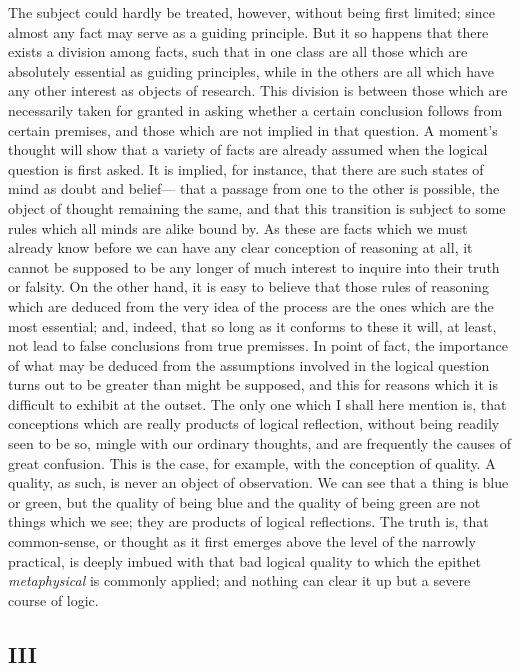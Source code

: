 The subject could hardly be treated, however, without being first limited; since almost any fact may serve as a guiding principle. But it so happens that there exists a division among facts, such that in one class are all those which are absolutely essential as guiding principles, while in the others are all which have any other interest as objects of research. This division is between those which are necessarily taken for granted in asking whether a certain conclusion follows from certain premises, and those which are not implied in that question. A moment's thought will show that a variety of facts are already assumed when the logical question is first asked. It is implied, for instance, that there are such states of mind as doubt and belief--- that a passage from one to the other is possible, the object of thought remaining the same, and that this transition is subject to some rules which all minds are alike bound by. As these are facts which we must already know before we can have any clear conception of reasoning at all, it cannot be supposed to be any longer of much interest to inquire into their truth or falsity. On the other hand, it is easy to believe that those rules of reasoning which are deduced from the very idea of the process are the ones which are the most essential; and, indeed, that so long as it conforms to these it will, at least, not lead to false conclusions from true premisses. In point of fact, the importance of what may be deduced from the assumptions involved in the logical question turns out to be greater than might be supposed, and this for reasons which it is difficult to exhibit at the outset. The only one which I shall here mention is, that conceptions which are really products of logical reflection, without being readily seen to be so, mingle with our ordinary thoughts, and are frequently the causes of great confusion. This is the case, for example, with the conception of quality. A quality, as such, is never an object of observation. We can see that a thing is blue or green, but the quality of being blue and the quality of being green are not things which we see; they are products of logical reflections. The truth is, that common-sense, or thought as it first emerges above the level of the narrowly practical, is deeply imbued with that bad logical quality to which the epithet \emph{metaphysical} is commonly applied; and nothing can clear it up but a severe course of logic.

\subsection*{III}

